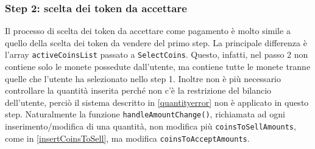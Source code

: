 \documentclass[a4paper]{article}
\begin{document}
        \subsubsection{Step 2: scelta dei token da accettare}
        Il processo di scelta dei token da accettare come pagamento è molto simile a quello della scelta dei token da vendere del primo step. La principale differenza è l'array \verb|activeCoinsList| passato a \verb|SelectCoins|.
        Questo, infatti, nel passo 2 non contiene solo le monete possedute dall'utente, ma contiene tutte le monete tranne quelle che l'utente ha selezionato nello step 1.
        \newline
        Inoltre non è più necessario controllare la quantità inserita perché non c'è la restrizione del bilancio dell'utente, perciò il sistema descritto in \ref{quantityerror} non è applicato in questo step.
        Naturalmente la funzione \verb|handleAmountChange()|, richiamata ad ogni inserimento/modifica di una quantità, non modifica più \verb|coinsToSellAmounts|, come in \ref{insertCoinsToSell}, ma modifica \verb|coinsToAcceptAmounts|.
\end{document}
